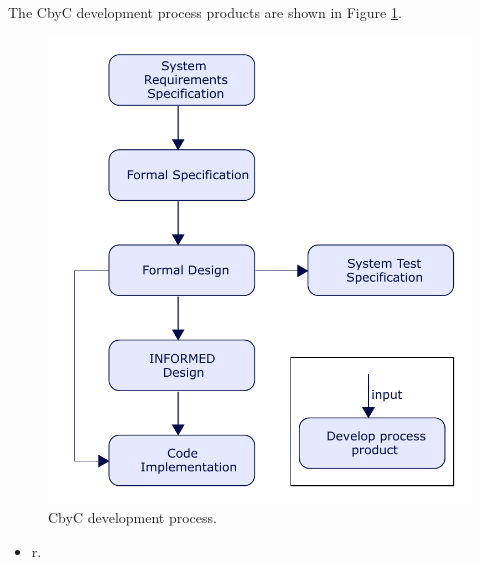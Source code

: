 The CbyC development process products are shown in Figure \ref{fig:CbyCDev}. 

\begin{figure}[H]
	\centering
	\includegraphics[scale=0.75]{Figures/CbyC_process.pdf}
	\decoRule
	\caption{CbyC development process.}
	\label{fig:CbyCDev}
\end{figure}


\begin{itemize}
	\item r.
\end{itemize}



